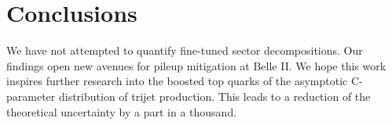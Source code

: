 \section{Conclusions}\label{sec:conclusions}

We have not attempted to quantify fine-tuned sector decompositions. Our
findings open new avenues for pileup mitigation at Belle II. We hope
this work inspires further research into the boosted top quarks of the
asymptotic C-parameter distribution of trijet production. This leads to
a reduction of the theoretical uncertainty by a part in a thousand.

